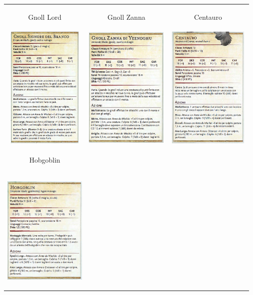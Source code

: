         \newpage   
        \begin{tabular}{|c|c|c|}
            \hline
            \hypertarget{gnoll}{Gnoll Lord}&  \hypertarget{gnoll}{Gnoll Zanna} & \hypertarget{Centauro}{Centauro} \\
            \includegraphics[width=4cm,height = 6cm]{../Mostri/Gnoll_lord.png}& \includegraphics[width=4cm,height = 6cm]{../Mostri/Gnoll_Zanna.png}&\includegraphics[width=4cm,height = 6cm]{../Mostri/Centauro.png}\\
            \hline
            \hypertarget{hobgoblin}{Hobgoblin}\\
            \includegraphics[width=4cm,height = 6cm]{../Mostri/Hobgoblin.png}\\
            \end{tabular} 
   

